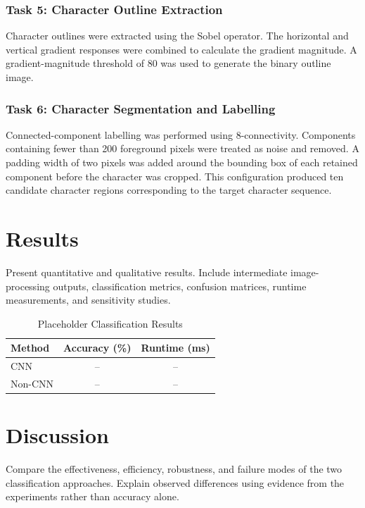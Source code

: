 \documentclass[conference]{IEEEtran}
\begin{document}
\subsubsection{Task 5: Character Outline Extraction}

Character outlines were extracted using the Sobel operator. The
horizontal and vertical gradient responses were combined to calculate
the gradient magnitude. A gradient-magnitude threshold of 80 was used
to generate the binary outline image.

\subsubsection{Task 6: Character Segmentation and Labelling}

Connected-component labelling was performed using 8-connectivity.
Components containing fewer than 200 foreground pixels were treated
as noise and removed. A padding width of two pixels was added around
the bounding box of each retained component before the character was
cropped. This configuration produced ten candidate character regions
corresponding to the target character sequence.

\section{Results}
Present quantitative and qualitative results. Include intermediate
image-processing outputs, classification metrics, confusion matrices, runtime
measurements, and sensitivity studies.

\begin{table}[t]
  \caption{Placeholder Classification Results}
  \label{tab:results}
  \centering
  \begin{tabular}{lcc}
    \toprule
    Method & Accuracy (\%) & Runtime (ms) \\
    \midrule
    CNN & -- & -- \\
    Non-CNN & -- & -- \\
    \bottomrule
  \end{tabular}
\end{table}

\section{Discussion}
Compare the effectiveness, efficiency, robustness, and failure modes of the two
classification approaches. Explain observed differences using evidence from the
experiments rather than accuracy alone.
\end{document}
